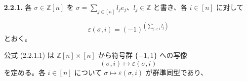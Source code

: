 \noindent\textbf{2.2.1.}\quad
各 $\sigma\in\mathbb Z[n]$ を
$\sigma=\sum_{j\in[n]}l_je_j$、$l_j\in\mathbb Z$ と書き、各
$i\in[n]$ に対して

\begin{equation}
  \varepsilon(\sigma,i)=(-1)^{\left(\sum_{j<i}l_j\right)}
  \tag{2.2.1.1}
\end{equation}
とおく。

公式 (2.2.1.1) は $\mathbb Z[n]\times[n]$ から符号群 $\{-1,1\}$ への写像
\begin{equation*}
  (\sigma,i)\longmapsto\varepsilon(\sigma,i)
\end{equation*}
を定める。各 $i\in[n]$ について
$\sigma\longmapsto\varepsilon(\sigma,i)$ が群準同型であり、
